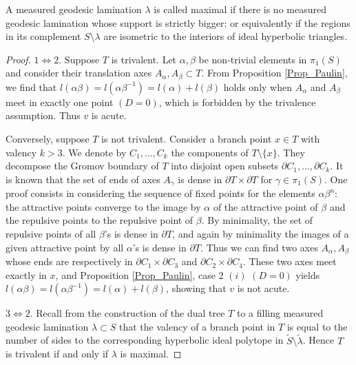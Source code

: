 \documentclass{amsart}
\begin{document}
A measured geodesic lamination $\lambda$ is called maximal if there is no measured geodesic lamination whose support is strictly bigger; or equivalently if the regions in its complement $S\setminus \lambda$ are isometric to the interiors of ideal hyperbolic triangles.
\begin{proof}
$1\iff 2$. Suppose $T$ is trivalent. Let $\alpha,\beta$ be non-trivial elements in $\pi_1(S)$ and consider their translation axes $A_\alpha,A_\beta\subset T$. From Proposition \ref{Prop_Paulin}, we find that $l(\alpha\beta)=l(\alpha\beta^{-1})=l(\alpha)+l(\beta)$ holds only when $A_\alpha$ and $A_\beta$ meet in exactly one point $(D=0)$, which is forbidden by the trivalence assumption. Thus $v$ is acute.

Conversely, suppose $T$ is not trivalent. Consider a branch point $x\in T$ with valency $k>3$. We denote by $C_1,\ldots,C_k$ the components of $T\setminus\{x\}$. They decompose the Gromov boundary of $T$ into disjoint open subsets $\partial C_1,\ldots,\partial C_k$.
%
It is known that the set of ends of axes $A_\gamma$ is dense in $\partial T\times \partial T$ for $\gamma\in \pi_1(S)$. One proof consists in considering the sequence of fixed points for the elements $\alpha \beta^n$: the attractive points converge to the image by $\alpha$ of the attractive point of $\beta$ and the repulsive points to the repulsive point of $\beta$. By minimality, the set of repulsive points of all $\beta$'s is dense in $\partial T$, and again by minimality the images of a given attractive point by all $\alpha$'s is dense in $\partial T$.
%
Thus we can find two axes $A_\alpha, A_\beta$ whose ends are respectively in $\partial C_1\times \partial C_3$ and $\partial C_2\times \partial C_4$. These two axes meet exactly in $x$, and Proposition \ref{Prop_Paulin}, case $2$ $(i)$ $(D=0)$ yields $l(\alpha\beta)=l(\alpha\beta^{-1})=l(\alpha)+l(\beta)$, showing that $v$ is not acute.

$3\iff 2$. Recall from the construction of the dual tree $T$ to a filling measured geodesic lamination $\lambda \subset S$ that the valency of a branch point in $T$ is equal to the number of sides to the corresponding hyperbolic ideal polytope in $\tilde{S}\setminus\tilde{\lambda}$. Hence $T$ is trivalent if and only if $\lambda$ is maximal.
%
%
\end{proof}
\end{document}
